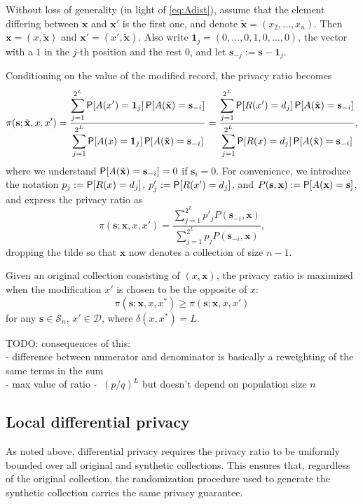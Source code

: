 \documentclass[11pt,draft]{article}
\newcommand{\Dsp}{\mathcal{D}}
\newcommand{\Ssp}{\mathcal{S}}
\newcommand{\xv}{\mathbf{x}}
\newcommand{\sv}{\mathbf{s}}
\newcommand{\xvt}{\tilde{\xv}}
\newcommand{\sm}{\sv^-}
\newcommand{\one}{\boldsymbol{1}}
\begin{document}
Without loss of generality (in light of \eqref{eq:Adist}), assume that the element differing between $\xv$ and $\xv'$ is the first one, and denote $\xvt = (x_2,\dots,x_n)$.
Then $\xv = (x,\xvt)$ and $\xv' = (x', \xvt)$.
Also write $\one_j = (0,\dots,0,1,0,\dots,0)$, the vector with a $1$ in the $j$-th position and the rest $0$, and let $\sv_{-j} := \sv - \one_j$.

Conditioning on the value of the modified record, the privacy ratio becomes
\begin{equation} \label{eq:prcond}
\pi(\sv;\xvt,x,x') = \frac{\displaystyle\sum_{j=1}^{2^L}
\P[A(x') = \one_j] \P[A(\xvt) = \sv_{-i}]}
{\displaystyle\sum_{j=1}^{2^L}
\P[A(x) = \one_j] \P[A(\xvt) = \sv_{-i}]}
= \frac{\displaystyle\sum_{j=1}^{2^L}
\P[R(x') = d_j] \P[A(\xvt) = \sv_{-i}]}
{\displaystyle\sum_{j=1}^{2^L}
\P[R(x) = d_j] \P[A(\xvt) = \sv_{-i}]},
\end{equation}
where we understand $\P[A(\xvt) = \sv_{-i}] = 0$ if $\sv_i = 0$.
For convenience, we introduce the notation $p_j := \P[R(x) = d_j]$,
$p'_j := \P[R(x') = d_j]$, and $P(\sv, \xv) := \P[A(\xv) = \sv]$, and express
the privacy ratio as
\[ \pi(\sv;\xv,x,x') = \frac{\displaystyle\sum_{j=1}^{2^L}
p'_j P(\sv_{-i},\xv)}{\displaystyle\sum_{j=1}^{2^L} p_j P(\sv_{-i},\xv)}, \]
dropping the tilde so that $\xv$ now denotes a collection of size $n-1$.

\begin{prop}
Given an original collection consisting of $(x, \xv)$, the privacy ratio is maximized when the modification $x'$ is chosen to be the opposite of $x$:
\[ \pi(\sv; \xv, x, x^*) \geq \pi(\sv; \xv, x, x') \]
for any $\sv\in\Ssp_n$, $x'\in \Dsp$, where $\delta(x, x^*) = L$.
\end{prop}


TODO: consequences of this: \\
- difference between numerator and denominator is basically a reweighting of the same terms in the sum \\
- max value of ratio -  $~ (p/q)^L$ but doesn't depend on population size $n$

\subsection{Local differential privacy}

As noted above, differential privacy requires the privacy ratio to be uniformly
bounded over all original and synthetic collections.
This ensures that, regardless of the original collection, the randomization
procedure used to generate the synthetic collection carries the same privacy
guarantee.
\end{document}

